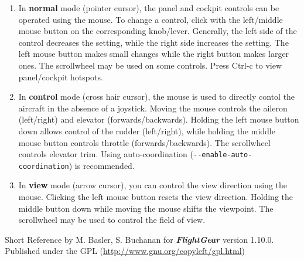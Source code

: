 \documentclass[10pt]{article}
\newcommand{\FlightGear}{{\itshape\bfseries FlightGear}}
\newcommand{\web}[1]{\href{#1}{#1}}
\begin{document}
 \begin{enumerate}
 \item In \textbf{normal} mode (pointer cursor), the panel and cockpit controls can be
 operated using the mouse. To change a control, click with the left/middle mouse button
 on the corresponding knob/lever. Generally, the left side of the control decreases the setting,
 while the right side increases the setting. The left mouse button makes small changes while the
 right button makes larger ones. The scrollwheel may be used on some controls.
 Press Ctrl-c to view panel/cockpit hotspots.

 \item In \textbf{control} mode (cross hair cursor), the mouse is used to directly contol
 the aircraft in the absence of a joystick. Moving the mouse controls the aileron (left/right)
 and elevator (forwards/backwards). Holding the left mouse button down allows control of the rudder (left/right), while holding the middle mouse button controls throttle (forwards/backwards). The scrollwheel controls
 elevator trim. Using auto-coordination (\texttt{-$ $-enable-auto-coordination}) is recommended.

 \item In \textbf{view} mode (arrow cursor), you can control the view direction using the mouse.
 Clicking the left mouse button resets the view direction. Holding the middle button down while
 moving the mouse shifts the viewpoint. The scrollwheel may be used to control the field of view.

\end{enumerate}

 \noindent
 Short Reference by M. Basler, S. Buchanan for \FlightGear{} version 1.10.0.\\
 Published under the GPL (\web{http://www.gnu.org/copyleft/gpl.html})
\end{document}
